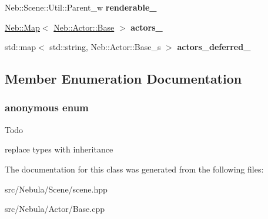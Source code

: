 \begin{DoxyCompactItemize}
\item 
\hypertarget{classNeb_1_1Scene_1_1Base_ab80c1fb37a3aa9bf1c3215b0f3614214}{\-Neb\-::\-Scene\-::\-Util\-::\-Parent\-\_\-w {\bfseries renderable\-\_\-}}\label{classNeb_1_1Scene_1_1Base_ab80c1fb37a3aa9bf1c3215b0f3614214}

\item 
\hypertarget{classNeb_1_1Scene_1_1Base_af8f8ecef2f02a6b5b30f444a17a260ef}{\hyperlink{classNeb_1_1Map}{\-Neb\-::\-Map}$<$ \hyperlink{classNeb_1_1Actor_1_1Base}{\-Neb\-::\-Actor\-::\-Base} $>$ {\bfseries actors\-\_\-}}\label{classNeb_1_1Scene_1_1Base_af8f8ecef2f02a6b5b30f444a17a260ef}

\item 
\hypertarget{classNeb_1_1Scene_1_1Base_abea83d53821e8fee2a51afc5223e9b7c}{std\-::map$<$ std\-::string, \*
\-Neb\-::\-Actor\-::\-Base\-\_\-s $>$ {\bfseries actors\-\_\-deferred\-\_\-}}\label{classNeb_1_1Scene_1_1Base_abea83d53821e8fee2a51afc5223e9b7c}

\end{DoxyCompactItemize}


\subsection{\-Member \-Enumeration \-Documentation}
\hypertarget{classNeb_1_1Scene_1_1Base_ad9c45dfefe66cecc599a4707b25a95f8}{\subsubsection[{anonymous enum}]{\setlength{\rightskip}{0pt plus 5cm}anonymous enum}}\label{classNeb_1_1Scene_1_1Base_ad9c45dfefe66cecc599a4707b25a95f8}
\begin{DoxyRefDesc}{\-Todo}
\item[{\bf \-Todo}]replace types with inheritance \end{DoxyRefDesc}


\-The documentation for this class was generated from the following files\-:\begin{DoxyCompactItemize}
\item 
src/\-Nebula/\-Scene/scene.\-hpp\item 
src/\-Nebula/\-Actor/\-Base.\-cpp\end{DoxyCompactItemize}

